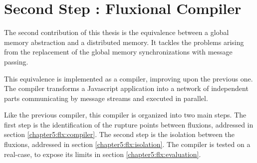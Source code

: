 \section{Second Step : Fluxional Compiler} \label{chapter5:flx}


The second contribution of this thesis is the equivalence between a global memory abstraction and a distributed memory.
It tackles the problems arising from the replacement of the global memory synchronizations with message passing.

This equivalence is implemented as a compiler, improving upon the previous one.
The compiler transforms a Javascript application into a network of independent parts communicating by message streams and executed in parallel.

Like the previous compiler, this compiler is organized into two main steps.
The first step is the identification of the rupture points between fluxions, addressed in section \ref{chapter5:flx:compiler}.
The second step is the isolation between the fluxions, addressed in section \ref{chapter5:flx:isolation}.
The compiler is tested on a real-case, to expose its limits in section \ref{chapter5:flx:evaluation}.





